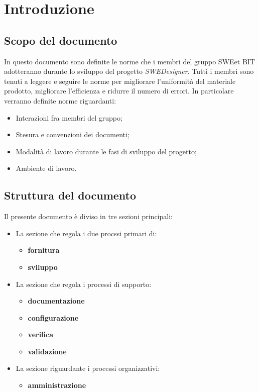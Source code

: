 \section{Introduzione}
  \subsection{Scopo del documento}
          In questo documento sono definite le norme che i membri del gruppo SWEet BIT adotteranno durante lo sviluppo del progetto \emph{SWEDesigner}.
          Tutti i membri sono tenuti a leggere e seguire le norme per migliorare l’uniformità del materiale prodotto, migliorare l’efficienza
          e ridurre il numero di errori.
          In particolare verranno definite norme riguardanti:
            \begin{itemize}
              \item Interazioni fra membri del gruppo;
              \item Stesura e convenzioni dei documenti;
              \item Modalità di lavoro durante le fasi di sviluppo del progetto;
              \item Ambiente di lavoro.
            \end{itemize}
  \subsection{Struttura del documento}
    Il presente documento è diviso in tre sezioni principali:
    \begin{itemize}
      \item La sezione che regola i due procssi primari di:
      \begin{itemize}
      \item \textbf{fornitura}
      \item \textbf{sviluppo}
      \end{itemize}
      \item La sezione che regola i processi di supporto:
      \begin{itemize}
      \item \textbf{documentazione}
      \item \textbf{configurazione}
      \item \textbf{verifica}
      \item \textbf{validazione}
      \end{itemize}
      \item La sezione riguardante i processi organizzativi:
	  \begin{itemize}     
      \item \textbf{amministrazione}
      \end{itemize} 
    \end{itemize}
